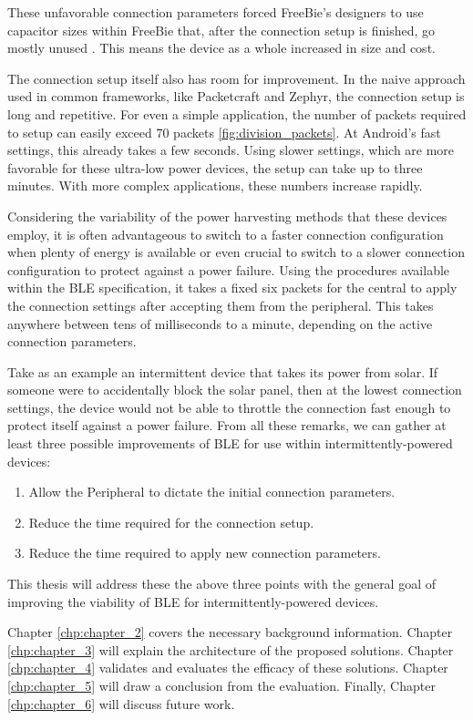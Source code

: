 These unfavorable connection parameters forced FreeBie's designers to use capacitor sizes within FreeBie that, after the connection setup is finished, go mostly unused \cite{freebie}. This means the device as a whole increased in size and cost. 

The connection setup itself also has room for improvement. In the naive approach used in common frameworks, like Packetcraft and Zephyr, the connection setup is long and repetitive. For even a simple application, the number of packets required to setup can easily exceed 70 packets \ref{fig:division_packets}. At Android's fast settings, this already takes a few seconds. Using slower settings, which are more favorable for these ultra-low power devices, the setup can take up to three minutes. With more complex applications, these numbers increase rapidly.

Considering the variability of the power harvesting methods that these devices employ, it is often advantageous to switch to a faster connection configuration when plenty of energy is available or even crucial to switch to a slower connection configuration to protect against a power failure. Using the procedures available within the BLE specification, it takes a fixed six packets for the central to apply the connection settings after accepting them from the peripheral. This takes anywhere between tens of milliseconds to a minute, depending on the active connection parameters. 

Take as an example an intermittent device that takes its power from solar. If someone were to accidentally block the solar panel, then at the lowest connection settings, the device would not be able to throttle the connection fast enough to protect itself against a power failure. From all these remarks, we can gather at least three possible improvements of BLE for use within intermittently-powered devices:
\begin{enumerate}
    \item Allow the Peripheral to dictate the initial connection parameters.
    \item Reduce the time required for the connection setup.
    \item Reduce the time required to apply new connection parameters.
\end{enumerate}
This thesis will address these the above three points with the general goal of improving the viability of BLE for intermittently-powered devices.

Chapter \ref*{chp:chapter_2} covers the necessary background information. Chapter \ref*{chp:chapter_3} will explain the architecture of the proposed solutions. Chapter \ref*{chp:chapter_4} validates and evaluates the efficacy of these solutions. Chapter \ref{chp:chapter_5} will draw a conclusion from the evaluation. Finally, Chapter \ref{chp:chapter_6} will discuss future work.

